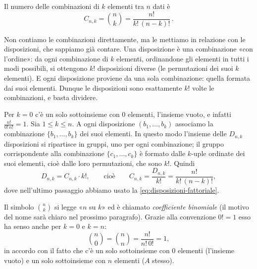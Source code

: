 \begin{teorema}\label{teo:combinazioni}
Il numero delle combinazioni di $k$ elementi tra $n$ dati è
\begin{equation}\label{eq:combinazioni}
  C_{n,k}=\binom{n}{k}=\frac{n!}{k!\,(n-k)!}\,.
\end{equation}
\end{teorema}

\begin{schema}
\end{schema}

\begin{strategia}
Non contiamo le combinazioni direttamente, ma le mettiamo in relazione con le
disposizioni, che sappiamo già contare. Una disposizione è una combinazione «con
l'ordine»: da ogni combinazione di $k$ elementi, ordinandone gli elementi in tutti i modi
possibili, si ottengono $k!$ disposizioni diverse (le permutazioni dei suoi $k$
elementi). E ogni disposizione proviene da una sola combinazione: quella formata dai suoi
elementi. Dunque le disposizioni sono esattamente $k!$ volte le combinazioni, e basta
dividere.
\end{strategia}

\begin{dimostrazione}
Per $k=0$ c'è un solo sottoinsieme con $0$ elementi, l'insieme vuoto, e infatti
$\frac{n!}{0!\,n!}=1$. Sia $1\le k\le n$. A ogni
disposizione $(b_{1},\dots,b_{k})$ associamo la combinazione $\{b_{1},\dots,b_{k}\}$ dei
suoi elementi. In questo modo l'insieme delle $D_{n,k}$ disposizioni si ripartisce in
gruppi, uno per ogni combinazione; il gruppo corrispondente alla combinazione
$\{c_{1},\dots,c_{k}\}$ è formato dalle $k$-uple ordinate dei suoi elementi, cioè dalle
loro permutazioni, che sono $k!$. Quindi
\[
  D_{n,k}=C_{n,k}\cdot k!, \qquad\text{cioè}\qquad
  C_{n,k}=\frac{D_{n,k}}{k!}=\frac{n!}{k!\,(n-k)!},
\]
dove nell'ultimo passaggio abbiamo usato la \eqref{eq:disposizioni-fattoriale}.
\end{dimostrazione}

Il simbolo $\binom nk$ si legge «$n$ su $k$» ed è chiamato \emph{coefficiente binomiale}
(il motivo del nome sarà chiaro nel prossimo paragrafo). Grazie alla convenzione $0!=1$
esso ha senso anche per $k=0$ e $k=n$:
\begin{equation}\label{eq:binomiale-estremi}
  \binom n0=\binom nn=\frac{n!}{n!\,0!}=1,
\end{equation}
in accordo con il fatto che c'è un solo sottoinsieme con $0$ elementi (l'insieme vuoto)
e un solo sottoinsieme con $n$ elementi ($A$ stesso).


